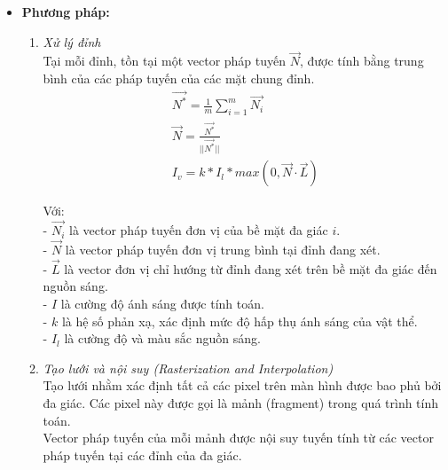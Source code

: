 \begin{enumerate}
\begin{itemize}
		\textbf{Specular:}
		Thành phần specular mô phỏng các vùng lóe sáng xuất hiện trên các bề mặt nhẵn hoặc bóng, nơi ánh sáng được phản xạ tập trung theo một hướng ưu tiên. Trong trường hợp lý tưởng, như bề mặt gương, ánh sáng phản xạ tuân theo định luật phản xạ, với góc phản xạ bằng góc tới. Trong mô hình Phong, hiện tượng này được xấp xỉ nhằm tái tạo cảm giác về độ bóng và độ nhẵn của vật liệu, đồng thời cung cấp các tín hiệu thị giác quan trọng để phân biệt các loại bề mặt khác nhau.
		
		\item \textbf{Phương pháp:}
		\begin{enumerate}
			\item \textit{Xử lý đỉnh}\\
			Tại mỗi đỉnh, tồn tại một vector pháp tuyến $\vec{N}$, được tính bằng trung bình của các pháp tuyến của các mặt chung đỉnh.
			\begin{gather*}
				\vec{N^*} = \frac{1}{m} \sum_{i=1}^{m} \vec{N_i}\\
				\vec{N} = \frac{\vec{N^*}}{||\vec{N^*}||}\\
				I_v = k * I_l * max(0, \vec{N} \cdot \vec{L})
			\end{gather*}
			
			Với:\\
			- $\vec{N_i}$ là vector pháp tuyến đơn vị của bề mặt đa giác $i$.\\
			- $\vec{N}$ là vector pháp tuyến đơn vị trung bình tại đỉnh đang xét.\\
			- $\vec{L}$ là vector đơn vị chỉ hướng từ đỉnh đang xét trên bề mặt đa giác đến nguồn sáng.\\
			- $I$ là cường độ ánh sáng được tính toán.\\
			- $k$ là hệ số phản xạ, xác định mức độ hấp thụ ánh sáng của vật thể.\\
			- $I_l$ là cường độ và màu sắc nguồn sáng.
			
			\item \textit{Tạo lưới và nội suy (Rasterization and Interpolation)}\\
			Tạo lưới nhằm xác định tất cả các pixel trên màn hình được bao phủ bởi đa giác. Các pixel này được gọi là mảnh (fragment) trong quá trình tính toán.\\
			Vector pháp tuyến của mỗi mảnh được nội suy tuyến tính từ các vector pháp tuyến tại các đỉnh của đa giác.
			

\end{enumerate}
\end{itemize}
\end{enumerate}
